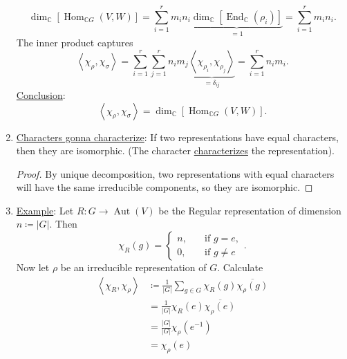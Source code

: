 \documentclass[12pt]{article}
\newcommand{\cx}{\mathbb{C}}
\newcommand\inv[1]{#1^{-1}}
\newcommand{\vbrack}[1]{\left \langle #1 \right \rangle}
\theoremstyle{definition}
\DeclareMathOperator\Aut{Aut}
\DeclareMathOperator\End{End}
\DeclareMathOperator\Hom{Hom}
\begin{document}
\begin{enumerate}
    \begin{equation}
        \dim_{\cx} \left[ \Hom_{\cx G} (V,W) \right] = \sum\limits_{i = 1}^r m_i n_i \underbrace{ \dim_{\cx} \left[ \End_{\cx} (\rho_i) \right] }_{=1} = \sum\limits_{i = 1}^r m_i n_i.
    \end{equation}
    The inner product captures
    \begin{equation}
        \vbrack{\chi_{\rho} , \chi_{\sigma}} = \sum\limits_{i = 1}^r \sum\limits_{j = 1}^r n_i m_j \underbrace{ \vbrack{\chi_{\rho_i} , \chi_{\rho_j}}  }_{ = \delta_{ij}} = \sum\limits_{i = 1}^r n_i m_i.
    \end{equation}
    \noindent \underline{Conclusion}: 
    \begin{equation}
        \boxed{ \vbrack{\chi_{\rho} , \chi_{\sigma}} = \dim_{\cx} \left[ \Hom_{\cx G} (V , W) \right]. }
    \end{equation}
    \item \underline{Characters gonna characterize}: If two representations have equal characters, then they are isomorphic. (The character \underline{characterizes} the representation).
    \begin{proof}
        By unique decomposition, two representations with equal characters will have the same irreducible components, so they are isomorphic.
    \end{proof}
    \item \underline{Example}: Let $R : G \to \Aut(V)$ be the Regular representation of dimension $n \coloneqq  |G|$. Then 
    \begin{equation}
        \chi_R (g) = 
        \begin{cases}
            n , & \quad \text{if $g = e$} , \\
            0 , & \quad \text{if $g \neq e$}
        \end{cases}.
    \end{equation}
    Now let $\rho$ be an irreducible representation of $G$. Calculate
    \begin{equation}
        \begin{split}
            \vbrack{\chi_R , \chi_{\rho}} & \coloneqq  \frac{1}{|G|} \sum\limits_{g \in G}\chi_{R} (g) \overline{\chi_{\rho} (g)} \\
            & = \frac{1}{|G|} \chi_{R} (e) \overline{ \chi_{\rho} (e) } \\
            & = \frac{|G|}{|G|} \chi_{\rho} \left( \inv{e} \right) \\
            & = \chi_{\rho}(e) \\

\end{split}
\end{equation}
\end{enumerate}
\end{document}
